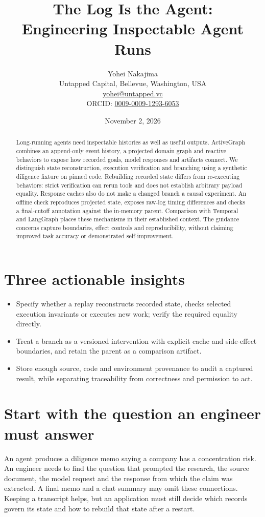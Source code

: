\documentclass[11pt]{article}
\title{The Log Is the Agent:\\Engineering Inspectable Agent Runs}
\author{Yohei Nakajima\\\small Untapped Capital, Bellevue, Washington, USA\\\small \href{mailto:yohei@untapped.vc}{yohei@untapped.vc}\\\small ORCID: \href{https://orcid.org/0009-0009-1293-6053}{0009-0009-1293-6053}}
\date{November 2, 2026}
\begin{document}
\maketitle

\begin{abstract}
Long-running agents need inspectable histories as well as useful outputs. ActiveGraph combines an append-only event history, a projected domain graph and reactive behaviors to expose how recorded goals, model responses and artifacts connect. We distinguish state reconstruction, execution verification and branching using a synthetic diligence fixture on pinned code. Rebuilding recorded state differs from re-executing behaviors: strict verification can rerun tools and does not establish arbitrary payload equality. Response caches also do not make a changed branch a causal experiment. An offline check reproduces projected state, exposes raw-log timing differences and checks a final-cutoff annotation against the in-memory parent. Comparison with Temporal and LangGraph places these mechanisms in their established context. The guidance concerns capture boundaries, effect controls and reproducibility, without claiming improved task accuracy or demonstrated self-improvement.
\end{abstract}

\section*{Three actionable insights}
\begin{itemize}
\item Specify whether a replay reconstructs recorded state, checks selected execution invariants or executes new work; verify the required equality directly.
\item Treat a branch as a versioned intervention with explicit cache and side-effect boundaries, and retain the parent as a comparison artifact.
\item Store enough source, code and environment provenance to audit a captured result, while separating traceability from correctness and permission to act.
\end{itemize}

\section*{Start with the question an engineer must answer}
An agent produces a diligence memo saying a company has a concentration risk. An engineer needs to find the question that prompted the research, the source document, the model request and the response from which the claim was extracted. A final memo and a chat summary may omit these connections. Keeping a transcript helps, but an application must still decide which records govern its state and how to rebuild that state after a restart.
\end{document}
